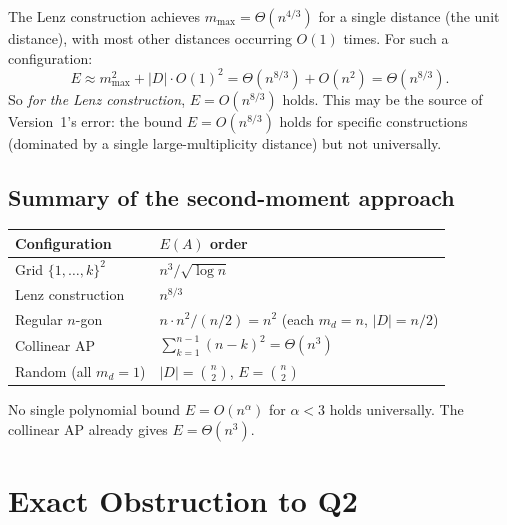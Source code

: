 \documentclass[12pt,a4paper]{amsart}
\theoremstyle{plain}
\theoremstyle{definition}
\begin{document}
The Lenz construction achieves $m_{\max}=\Theta(n^{4/3})$ for a single
distance (the unit distance), with most other distances occurring $O(1)$ times.
For such a configuration:
\[
  E \approx m_{\max}^2 + |D|\cdot O(1)^2
  = \Theta(n^{8/3}) + O(n^2) = \Theta(n^{8/3}).
\]
So \emph{for the Lenz construction}, $E=O(n^{8/3})$ holds.
This may be the source of Version~1's error: the bound $E=O(n^{8/3})$
holds for specific constructions (dominated by a single large-multiplicity distance)
but not universally.

\subsection{Summary of the second-moment approach}

\begin{center}
\begin{tabular}{ll}
\toprule
Configuration & $E(A)$ order \\
\midrule
Grid $\{1,\ldots,k\}^2$ & $n^3/\sqrt{\log n}$ \\
Lenz construction & $n^{8/3}$ \\
Regular $n$-gon & $n\cdot n^2 / (n/2) = n^2$ (each $m_d=n$, $|D|=n/2$) \\
Collinear AP & $\sum_{k=1}^{n-1}(n-k)^2=\Theta(n^3)$ \\
Random (all $m_d=1$) & $|D|=\binom{n}{2}$, $E=\binom{n}{2}$ \\
\bottomrule
\end{tabular}
\end{center}

No single polynomial bound $E=O(n^\alpha)$ for $\alpha<3$ holds universally.
The collinear AP already gives $E=\Theta(n^3)$.

\section{Exact Obstruction to Q2}
\label{sec:obstruction}
\end{document}
